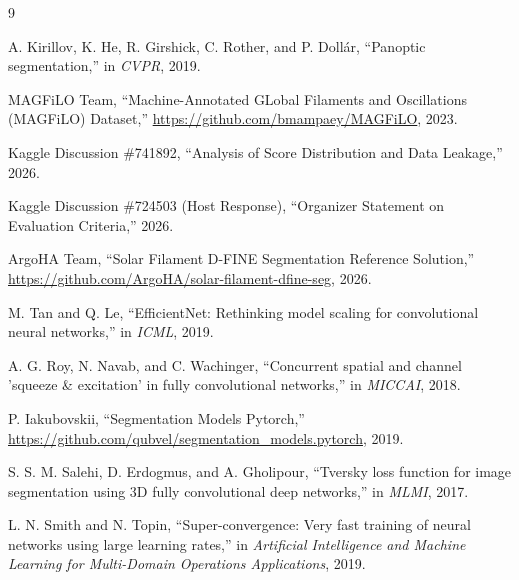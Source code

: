 \documentclass[conference]{IEEEtran}
\begin{document}
\begin{thebibliography}{9}

A. Kirillov, K. He, R. Girshick, C. Rother, and P. Dollár,
``Panoptic segmentation,''
in \textit{CVPR}, 2019.

MAGFiLO Team,
``Machine-Annotated GLobal Filaments and Oscillations (MAGFiLO) Dataset,''
\url{https://github.com/bmampaey/MAGFiLO}, 2023.

Kaggle Discussion \#741892,
``Analysis of Score Distribution and Data Leakage,''
2026.

Kaggle Discussion \#724503 (Host Response),
``Organizer Statement on Evaluation Criteria,''
2026.

ArgoHA Team,
``Solar Filament D-FINE Segmentation Reference Solution,''
\url{https://github.com/ArgoHA/solar-filament-dfine-seg}, 2026.

M. Tan and Q. Le,
``EfficientNet: Rethinking model scaling for convolutional neural networks,''
in \textit{ICML}, 2019.

A. G. Roy, N. Navab, and C. Wachinger,
``Concurrent spatial and channel 'squeeze \& excitation' in fully convolutional networks,''
in \textit{MICCAI}, 2018.

P. Iakubovskii,
``Segmentation Models Pytorch,''
\url{https://github.com/qubvel/segmentation_models.pytorch}, 2019.

S. S. M. Salehi, D. Erdogmus, and A. Gholipour,
``Tversky loss function for image segmentation using 3D fully convolutional deep networks,''
in \textit{MLMI}, 2017.

L. N. Smith and N. Topin,
``Super-convergence: Very fast training of neural networks using large learning rates,''
in \textit{Artificial Intelligence and Machine Learning for Multi-Domain Operations Applications}, 2019.

\end{thebibliography}
\end{document}
